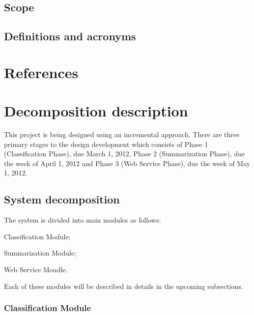 \documentclass[12pt]{article}
\newenvironment{my_itemize}
{\begin{itemize}
  \setlength{\itemsep}{0cm}
  \setlength{\parskip}{0cm}}
{\end{itemize}}
\begin{document}
\subsection{Scope}
\subsection{Definitions and acronyms}

\section{References}

\section{Decomposition description}
This project is being designed using an incremental approach. There are three primary stages to the design development which consists of Phase 1 (Classification Phase), due March 1, 2012, Phase 2 (Summarization Phase), due the week of April 1, 2012 and Phase 3 (Web Service Phase), due the week of May 1, 2012.

\subsection{System decomposition}
The system is divided into main modules as follows:
\begin{my_itemize}
\item Classification Module;
\item Summarization Module;
\item Web Service Moudle.
\end{my_itemize}
Each of these modules will be described in details in the upcoming subsections.

\subsubsection{Classification Module}
\end{document}
